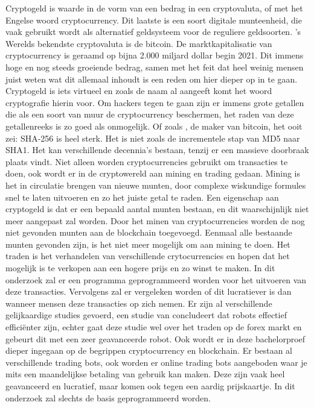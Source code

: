 Cryptogeld is waarde in de vorm van een bedrag in een cryptovaluta, of met het Engelse woord cryptocurrency. Dit laatste is een soort digitale munteenheid, die vaak gebruikt wordt als alternatief geldsysteem voor de reguliere geldsoorten. 's Werelds bekendste cryptovaluta is de bitcoin. De marktkapitalisatie van cryptocurrency is geraamd op bijna 2.000 miljard dollar begin 2021. Dit immens hoge en nog steeds groeiende bedrag, samen met het feit dat heel weinig mensen juist weten wat dit allemaal inhoudt is een reden om hier dieper op in te gaan. Cryptogeld is iets virtueel en zoals de naam al aangeeft komt het woord cryptografie hierin voor. Om hackers tegen te gaan zijn er immens grote getallen die als een soort van muur de cryptocurrency beschermen, het raden van deze getallenreeks is zo goed als onmogelijk. Of zoals \textcite{Nakamoto2010}, de maker van bitcoin, het ooit zei: SHA-256 is heel sterk.  Het is niet zoals de incrementele stap van MD5 naar SHA1. Het kan verschillende decennia’s bestaan, tenzij er een massieve doorbraak plaats vindt.
Niet alleen worden cryptocurrencies gebruikt om transacties te doen, ook wordt er in de cryptowereld aan mining en trading gedaan. Mining is het in circulatie brengen van nieuwe munten, door complexe wiskundige formules snel te laten uitvoeren en zo het juiste getal te raden. Een eigenschap aan cryptogeld is dat er een bepaald aantal munten bestaan, en dit waarschijnlijk niet meer aangepast zal worden. Door het minen van cryptocurrencies worden de nog niet gevonden munten aan de blockchain toegevoegd. Eenmaal alle bestaande munten gevonden zijn, is het niet meer mogelijk om aan mining te doen. Het traden is het verhandelen van verschillende crytocurrencies en hopen dat het mogelijk is te verkopen aan een hogere prijs en zo winst te maken.
In dit onderzoek zal er een programma geprogrammeerd worden voor het uitvoeren van deze transacties. Vervolgens zal er vergeleken worden of dit lucratiever is dan wanneer mensen deze transacties op zich nemen. Er zijn al verschillende gelijkaardige studies gevoerd, een studie van \textcite{MarliDamiaoAbade2021} concludeert dat robots effectief efficiënter zijn, echter gaat deze studie wel over het traden op de forex markt en gebeurt dit met een zeer geavanceerde robot. Ook wordt er in deze bachelorproef dieper ingegaan op de begrippen cryptocurrency en blockchain. Er bestaan al verschillende trading bots, ook worden er online trading bots aangeboden waar je mits een maandelijkse betaling van gebruik kan maken. Deze zijn vaak heel geavanceerd en lucratief, maar komen ook tegen een aardig prijskaartje. In dit onderzoek zal slechts de basis geprogrammeerd worden.


